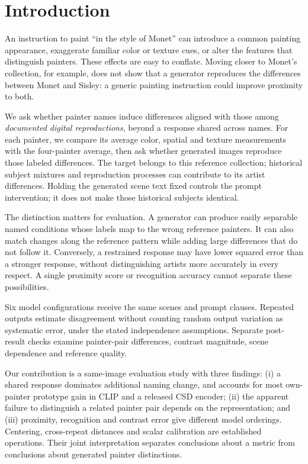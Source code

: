 \section{Introduction}
An instruction to paint ``in the style of Monet'' can introduce a common
painting appearance, exaggerate familiar color or texture cues, or alter the
features that distinguish painters. These effects are easy to
conflate. Moving closer to Monet's collection, for example, does not show that
a generator reproduces the differences between Monet and Sisley: a generic
painting instruction could improve proximity to both.

We ask whether painter names induce differences aligned with those among
\emph{documented digital reproductions}, beyond a response shared across names.
For each painter, we compare its average color, spatial and texture measurements
with the four-painter average, then ask whether generated images reproduce
those labeled differences. The target belongs to this reference collection;
historical subject
mixtures and reproduction processes can contribute to its artist differences.
Holding the generated scene text fixed controls the prompt intervention; it
does not make those historical subjects identical.

The distinction matters for evaluation. A generator can produce easily
separable named conditions whose labels map to the wrong reference painters.
It can also match changes along the reference pattern while adding large
differences that do not follow it. Conversely, a restrained response may have lower squared
error than a stronger response, without distinguishing artists more accurately
in every respect. A single proximity score or recognition accuracy cannot
separate these possibilities.

Six model configurations receive the same scenes and prompt clauses.
Repeated outputs estimate
disagreement without counting random output variation as systematic error, under
the stated independence assumptions. Separate post-result checks examine
painter-pair differences, contrast magnitude, scene dependence and reference quality.

Our contribution is a same-image evaluation study with three findings: (i) a
shared response dominates additional naming change, and accounts for most
own-painter prototype gain in CLIP and a released CSD encoder; (ii) the apparent
failure to distinguish a related painter pair depends on the representation;
and (iii) proximity, recognition and contrast error give different model orderings.
Centering, cross-repeat distances and scalar calibration are established
operations. Their joint interpretation separates conclusions about a metric
from conclusions about generated painter distinctions.


